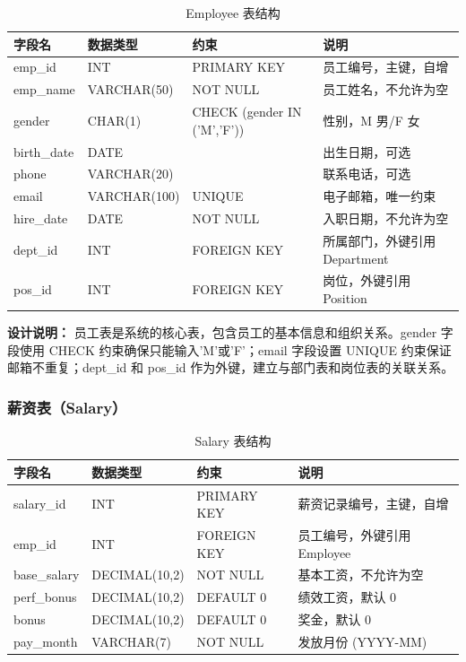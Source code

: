 \documentclass[12pt,a4paper]{article}
\begin{document}
\begin{table}[htbp]
  \centering
  \caption{Employee 表结构}
  \renewcommand{\arraystretch}{1.3}
  \begin{tabularx}{\textwidth}{l l l X}
    \toprule
    \textbf{字段名} & \textbf{数据类型} & \textbf{约束} & \textbf{说明} \\
    \midrule
    emp\_id & INT & PRIMARY KEY & 员工编号，主键，自增 \\
    emp\_name & VARCHAR(50) & NOT NULL & 员工姓名，不允许为空 \\
    gender & CHAR(1) & CHECK (gender IN ('M','F')) & 性别，M 男/F 女 \\
    birth\_date & DATE & & 出生日期，可选 \\
    phone & VARCHAR(20) & & 联系电话，可选 \\
    email & VARCHAR(100) & UNIQUE & 电子邮箱，唯一约束 \\
    hire\_date & DATE & NOT NULL & 入职日期，不允许为空 \\
    dept\_id & INT & FOREIGN KEY & 所属部门，外键引用 Department \\
    pos\_id & INT & FOREIGN KEY & 岗位，外键引用 Position \\
    \bottomrule
  \end{tabularx}
\end{table}

\textbf{设计说明：} 员工表是系统的核心表，包含员工的基本信息和组织关系。gender 字段使用 CHECK 约束确保只能输入'M'或'F'；email 字段设置 UNIQUE 约束保证邮箱不重复；dept\_id 和 pos\_id 作为外键，建立与部门表和岗位表的关联关系。

\subsubsection{薪资表（Salary）}

\begin{table}[htbp]
  \centering
  \caption{Salary 表结构}
  \renewcommand{\arraystretch}{1.3}
  \begin{tabularx}{\textwidth}{l l l X}
    \toprule
    \textbf{字段名} & \textbf{数据类型} & \textbf{约束} & \textbf{说明} \\
    \midrule
    salary\_id & INT & PRIMARY KEY & 薪资记录编号，主键，自增 \\
    emp\_id & INT & FOREIGN KEY & 员工编号，外键引用 Employee \\
    base\_salary & DECIMAL(10,2) & NOT NULL & 基本工资，不允许为空 \\
    perf\_bonus  & DECIMAL(10,2) & DEFAULT 0 & 绩效工资，默认 0 \\
    bonus        & DECIMAL(10,2) & DEFAULT 0 & 奖金，默认 0 \\
    pay\_month & VARCHAR(7) & NOT NULL & 发放月份 (YYYY-MM) \\
    \bottomrule
  \end{tabularx}
\end{table}
\end{document}
